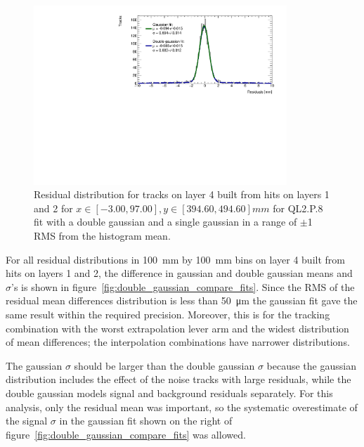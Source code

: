 \begin{figure}
    \centering
    \includegraphics[width = 0.85\textwidth]{figures/figure_double_gaus_vs_gaus_example_fit_QL2P08_3100V_2021-06-18_and_2021-07-19_xbin_10_ybin_5_layer4_fixedlayers12.pdf}
    \caption{Residual distribution for tracks on layer 4 built from hits on layers 1 and 2 for $x\in\left[-3.00, 97.00\right],  y\in\left[394.60, 494.60\right] mm$ for QL2.P.8 fit with a double gaussian and a single gaussian in a range of $\pm$1 RMS from the histogram mean.}
    \label{fig:double_gaussian_example_fit}
\end{figure}

For all residual distributions in \SI{100}{\milli\meter} by \SI{100}{\milli\meter} bins on layer 4 built from hits on layers 1 and 2, the difference in gaussian and double gaussian means and $\sigma$'s is shown in figure~\ref{fig:double_gaussian_compare_fits}. Since the RMS of the residual mean differences distribution is less than \SI{50}{\micro\meter} the gaussian fit gave the same result within the required precision. Moreover, this is for the tracking combination with the worst extrapolation lever arm and the widest distribution of mean differences; the interpolation combinations have narrower distributions. 

The gaussian $\sigma$ should be larger than the double gaussian $\sigma$ because the gaussian distribution includes the effect of the noise tracks with large residuals, while the double gaussian models signal and background residuals separately. For this analysis, only the residual mean was important, so the systematic overestimate of the signal $\sigma$ in the gaussian fit shown on the right of figure~\ref{fig:double_gaussian_compare_fits} was allowed.

